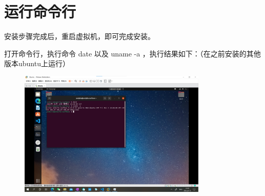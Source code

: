 \documentclass[UTF8]{ctexart}
\begin{document}
    \section{运行命令行}
    安装步骤完成后，重启虚拟机，即可完成安装。
    \par 打开命令行，执行命令 date 以及 uname -a ，执行结果如下：（在之前安装的其他版本ubuntu上运行）
    \begin{figure}[H]
        \centering
        \includegraphics[width=0.8\textwidth]{assets/l6.png}
    \end{figure}
\end{document}
